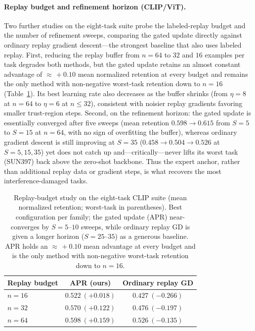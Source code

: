 \documentclass[11pt]{article}
\begin{document}
\paragraph{Replay budget and refinement horizon (CLIP/ViT).}
Two further studies on the eight-task suite probe the labeled-replay budget and the number of refinement sweeps, comparing the gated update directly against ordinary replay gradient descent---the strongest baseline that also uses labeled replay. First, reducing the replay buffer from $n=64$ to $32$ and $16$ examples per task degrades both methods, but the gated update retains an almost constant advantage of ${\approx}\,+0.10$ mean normalized retention at every budget and remains the only method with non-negative worst-task retention down to $n=16$ (Table~\ref{tab:clipbudget}). Its best learning rate also decreases as the buffer shrinks (from $\eta=8$ at $n=64$ to $\eta=6$ at $n\le 32$), consistent with noisier replay gradients favoring smaller trust-region steps. Second, on the refinement horizon: the gated update is essentially converged after five sweeps (mean retention $0.598\to0.615$ from $S=5$ to $S=15$ at $n=64$, with no sign of overfitting the buffer), whereas ordinary gradient descent is still improving at $S=35$ ($0.458\to0.504\to0.526$ at $S=5,15,35$) yet does not catch up and---critically---never lifts its worst task (SUN397) back above the zero-shot backbone. Thus the expert anchor, rather than additional replay data or gradient steps, is what recovers the most interference-damaged tasks.

\begin{table}[t]
\centering
\caption{Replay-budget study on the eight-task CLIP suite (mean normalized retention; worst-task in parentheses). Best configuration per family; the gated update (APR) near-converges by $S=5\text{--}10$ sweeps, while ordinary replay GD is given a longer horizon ($S=25\text{--}35$) as a generous baseline. APR holds an ${\approx}\,+0.10$ mean advantage at every budget and is the only method with non-negative worst-task retention down to $n=16$.}
\label{tab:clipbudget}
\begin{tabular}{lcc}
\toprule
Replay budget & \textbf{APR (ours)} & Ordinary replay GD \\
\midrule
$n=16$ & $\mathbf{0.522}\ (\mathbf{+0.018})$ & $0.427\ (-0.266)$ \\
$n=32$ & $\mathbf{0.570}\ (\mathbf{+0.122})$ & $0.476\ (-0.197)$ \\
$n=64$ & $\mathbf{0.598}\ (\mathbf{+0.159})$ & $0.526\ (-0.135)$ \\
\bottomrule
\end{tabular}
\end{table}
\end{document}
